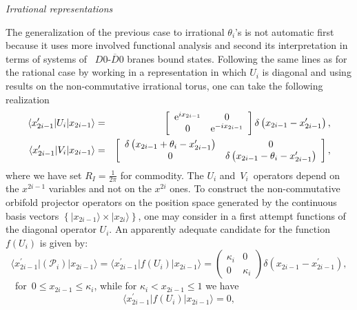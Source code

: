 \documentclass[a4paper,12pt]{article}
\begin{document}
\textit{Irrational representations}

\quad The generalization of the previous case to irrational
$\theta _{i}$'s is not automatic first because it uses more
involved functional analysis and second its interpretation in
terms of systems of \ $D0$-$\overline{D}0$ branes bound states.
Following the same lines as for the rational case by working in a
representation in which $U_{i}$ is diagonal and using results on
the non-commutative irrational torus, one can take the following
realization
\begin{eqnarray}
\langle x_{2i-1}^{\prime }|U_{i}|x_{2i-1}\rangle &=&\left[
\begin{array}{cc}
\text{e}^{ix_{2i-1}} & 0 \\
0 & \text{e}^{-ix_{2i-1}}
\end{array}
\right] \delta \left( x_{2i-1}-x_{2i-1}^{\prime }\right) , \notag\\
\langle x_{2i-1}^{\prime }|V_{i}|x_{2i-1}\rangle &=&\left[
\begin{array}{cc}
\delta \left( x_{2i-1}+\theta _{i}-x_{2i-1}^{\prime }\right) & 0 \\
0 & \delta \left( x_{2i-1}-\theta _{i}-x_{2i-1}^{\prime }\right)
\end{array}
\right] ,\label{irratrep}
\end{eqnarray}
where we have set $R_{I}=\frac{1}{2\pi }$ for commodity. The $U_{i}$ and\ $%
V_{i}$\ operators depend on the $x^{2i-1}$ variables and not on the $x^{2i}$%
  ones. To construct the non-commutative orbifold projector operators on the
position space generated by the continuous basis vectors $\left\{
|x_{2i-1}\rangle \times |x_{2i}\rangle \right\} $, one may
consider in a first attempt functions of the diagonal operator
$U_{i}$. An apparently adequate candidate for the function
$f(U_{i})$ is given by:
\begin{equation}\label{irratpro}
\langle x_{2i-1}^{\prime }|(\mathcal{P}_{i})|x_{2i-1}\rangle =\langle
x_{2i-1}^{\prime }|f(U_{i})|x_{2i-1}\rangle =\left(
\begin{array}{cc}
\kappa _{i} & 0 \\
0 & \kappa _{i}
\end{array}
\right) \delta \left( x_{2i-1}-x_{2i-1}^{\prime }\right) ,
\end{equation}
\ \ for\ $0\leq x_{2i-1}\leq \kappa _{i}$, while for $\kappa
_{i}<x_{2i-1}\leq 1$ we have
\begin{equation*}
\langle x_{2i-1}^{\prime }|f(U_{i})|x_{2i-1}\rangle =0,
\end{equation*}
\end{document}
